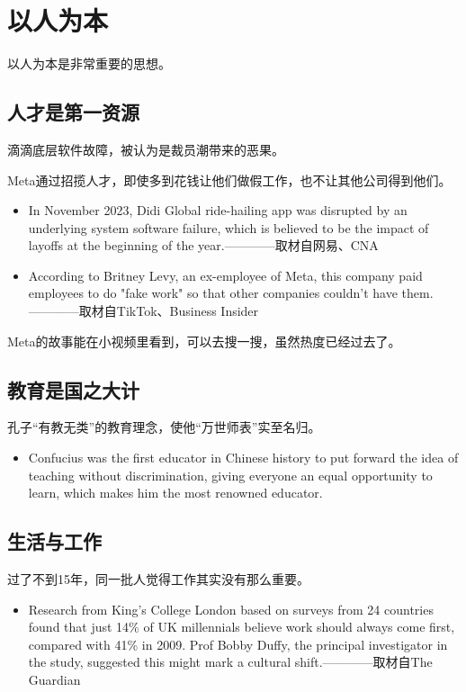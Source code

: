 \graphicspath{{Images/}}

\section{以人为本}
以人为本是非常重要的思想。
\subsection{人才是第一资源}
滴滴底层软件故障，被认为是裁员潮带来的恶果。
\par
Meta通过招揽人才，即使多到花钱让他们做假工作，也不让其他公司得到他们。
\begin{itemize}
    \item In November 2023, Didi Global ride-hailing app was disrupted by an underlying system software failure, which is believed to be the impact of layoffs at the beginning of the year.————取材自网易、CNA
    \item According to Britney Levy, an ex-employee of Meta, this company paid employees to do "fake work" so that other companies couldn't have them.————取材自TikTok\cite{metalayouts}、Business Insider
\end{itemize}
\par
Meta的故事能在小视频里看到，可以去搜一搜，虽然热度已经过去了。
\subsection{教育是国之大计}
孔子“有教无类”的教育理念，使他“万世师表”实至名归。
\begin{itemize}
    \item Confucius was the first educator in Chinese history to put forward the idea of teaching without discrimination, giving everyone an equal opportunity to learn, which makes him the most renowned educator.
\end{itemize}
\subsection{生活与工作}
过了不到15年，同一批人觉得工作其实没有那么重要。
\begin{itemize}
    \item Research from King's College London based on surveys from 24 countries found that just 14\% of UK millennials believe work should always come first, compared with 41\% in 2009. Prof Bobby Duffy, the principal investigator in the study, suggested this might mark a cultural shift.————取材自The Guardian
\end{itemize}

